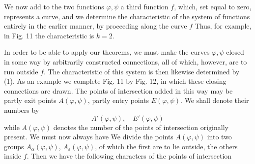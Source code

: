 We now add to the two functions $\varphi, \psi$ a third function $f$, which, set equal to zero, represents a  curve, and we determine the characteristic of the system of functions entirely in the earlier manner, by proceeding along the curve $f$
Thus, for example, in Fig. 11 the characteristic is $k = 2$.


In order to be able to apply our theorems, we must make the curves $\varphi, \psi$ closed in some way by arbitrarily constructed connections, all of which, however, are to run outside $f$. The characteristic of this system is then likewise determined by (1). As an example we complete Fig. 11 by Fig. 12, in which these closing connections are drawn. The points of intersection added in this way may be partly exit points $A(\varphi,\psi)$, partly entry points $E(\varphi,\psi)$. We shall denote their numbers by
\[
A'(\varphi,\psi), \quad E'(\varphi,\psi)
\]
while $A(\varphi,\psi)$ denotes the number of the points of intersection originally present. We must now always have
We divide the points $A(\varphi,\psi)$ into two groups $A_\alpha(\varphi,\psi)$, $A_\varepsilon(\varphi,\psi)$, of which the first are to lie outside, the others inside $f$. Then we have the following characters of the points of intersection
